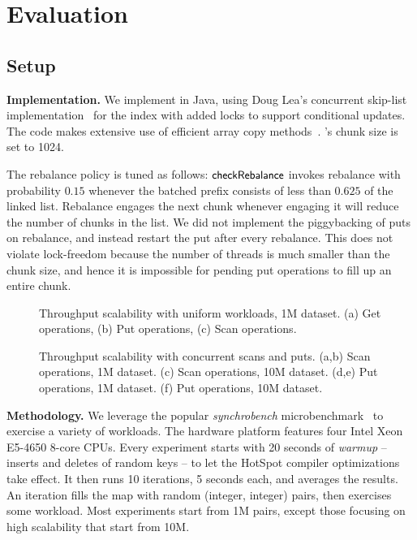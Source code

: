 \section{Evaluation}
\label{sec:eval}

\subsection{Setup}

{\bf Implementation.} We implement {\kiwi} in Java, using Doug Lea's concurrent skip-list 
implementation~\cite{JavaConcurrentSkipList} for the index with added locks to support conditional updates. 
The code makes extensive use of efficient 
array copy methods~\cite{JavaArrayCopy}. {\kiwi}'s chunk size is set to 1024. 

The rebalance policy is tuned as follows:
$\code{checkRebalance}$  invokes rebalance with probability $0.15$ whenever
 the batched prefix consists of less than $0.625$ of the linked list. Rebalance 
engages the next chunk whenever engaging it will reduce the number of chunks in the list. 
We did not implement the piggybacking of puts on rebalance, and instead restart the put after every rebalance.
This does not violate lock-freedom because the number of threads is much smaller than the chunk size, and 
hence it is impossible for pending put operations to fill up an entire chunk.

\begin{figure*}
\begin{center}

\end{center}
\caption{Throughput scalability with uniform workloads, 1M dataset. (a) Get operations, (b) Put operations, (c) Scan operations. }
\label{evaluation:results:getputscan}
\end{figure*}

\begin{figure*}
\begin{center}

\end{center}
\caption{Throughput scalability with concurrent scans and puts. (a,b) Scan operations, 1M dataset. 
(c) Scan operations, 10M dataset. (d,e) Put operations, 1M dataset. (f) Put operations, 10M dataset.  }
\label{evaluation:results:scan}
\end{figure*}

\textbf{Methodology.}
We leverage the popular {\em synchrobench}  microbenchmark~\cite{Gramoli2015}
to exercise a variety of workloads. The hardware platform %
features four Intel Xeon E5-4650 8-core CPUs. %
Every experiment starts with 20 seconds of {\em warmup} -- inserts
and deletes of random keys -- to let the HotSpot compiler optimizations take effect. 
It then runs 10  iterations, 5 seconds each, and averages the results. An iteration fills the map with 
random (integer, integer) pairs, then exercises some workload. 
Most experiments start from 1M pairs, except those focusing on high scalability that start from 10M.

